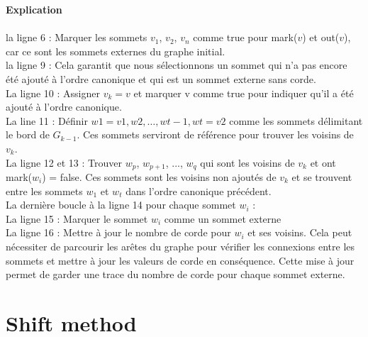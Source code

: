 \documentclass[hidelinks,letterpaper,12pt]{article}
\begin{document}
\textbf{Explication}
\\ \\
la ligne 6 : Marquer les sommets $v_1$, $v_2$, $v_n$ comme true pour mark($v$) et out($v$), car ce sont les sommets externes du graphe initial.
\\
la ligne 9 : Cela garantit que nous sélectionnons un sommet qui n'a pas encore été ajouté à l'ordre canonique et qui est un sommet externe sans corde.
\\
La ligne 10 : Assigner $v_k = v$ et marquer v comme true pour indiquer qu'il a été ajouté à l'ordre canonique.
\\
La line 11 : Définir $w1 = v1, w2, \dots, wt-1, wt = v2$ comme les sommets délimitant le bord de $G_{k-1}$. Ces sommets serviront de référence pour trouver les voisins de $v_k$.
\\
La ligne 12 et 13 : 
Trouver $w_p$, $w_{p+1}$, ..., $w_q$ qui sont les voisins de $v_k$ et ont mark($w_i$) = false. Ces sommets sont les voisins non ajoutés de $v_k$ et se trouvent entre les sommets $w_1$ et $w_t$ dans l'ordre canonique précédent.
\\
La dernière boucle à la ligne 14 pour chaque sommet $w_i$ :
\\
La ligne 15 : Marquer le sommet $w_i$ comme un sommet externe
\\
La ligne 16 : Mettre à jour le nombre de corde pour $w_i$ et ses voisins. Cela peut nécessiter de parcourir les arêtes du graphe pour vérifier les connexions entre les sommets et mettre à jour les valeurs de corde en conséquence. Cette mise à jour permet de garder une trace du nombre de corde pour chaque sommet externe.
\newpage 
\section{Shift method}
\label{Shift méthode}
\end{document}
